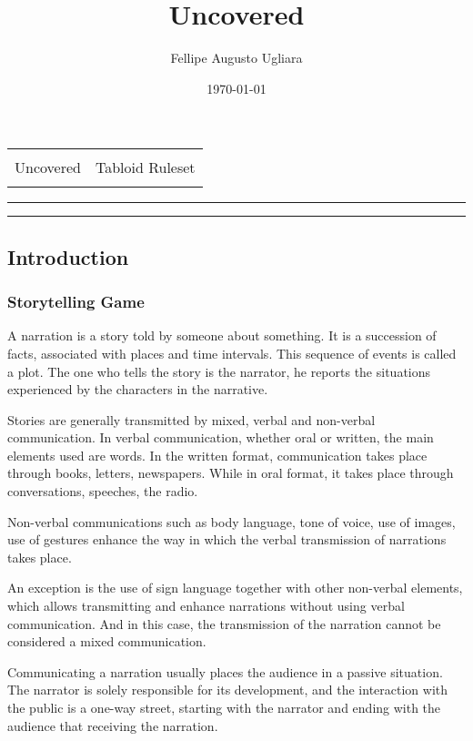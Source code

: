 \documentclass[11pt]{article}
\title{\huge{Uncovered}}
\author{Fellipe Augusto Ugliara}
\date{\today}
\makeatletter
\renewcommand\maketitle{
	{\raggedright
		\begin{tabularx}{\textwidth}{@{}l@{\extracolsep{\fill}}r@{}}
			\multirow{3}{*}{\fontsize{60pt}{60pt}\selectfont Uncovered} & 
			\vspace{-0.4cm}  \\ 
			& {\huge Tabloid Ruleset}  \\ [0.25cm]
			& {\huge \@date}
		\end{tabularx}
	}
}
\makeatother
\begin{document}
\maketitle

\noindent\rule{\textwidth}{0.1pt}
\begin{multicols}{3}
	\small	\tableofcontents \normalsize
\end{multicols}
\noindent\rule{\textwidth}{0.1pt}

\begin{multicols}{2}
\setlength{\columnseprule}{0pt}

\part{Introduction}

\lipsum[1]

\section{Storytelling Game}

A narration is a story told by someone about something. It is a succession of facts, associated with places and time intervals. This sequence of events is called a plot. The one who tells the story is the narrator, he reports the situations experienced by the characters in the narrative.

Stories are generally transmitted by mixed, verbal and non-verbal communication. In verbal communication, whether oral or written, the main elements used are words. In the written format, communication takes place through books, letters, newspapers. While in oral format, it takes place through conversations, speeches, the radio.

Non-verbal communications such as body language, tone of voice, use of images, use of gestures enhance the way in which the verbal transmission of narrations takes place.

An exception is the use of sign language together with other non-verbal elements, which allows transmitting and enhance narrations without using verbal communication. And in this case, the transmission of the narration cannot be considered a mixed communication.

Communicating a narration usually places the audience in a passive situation. The narrator is solely responsible for its development, and the interaction with the public is a one-way street, starting with the narrator and ending with the audience that receiving the narration.


\end{multicols}
\end{document}
